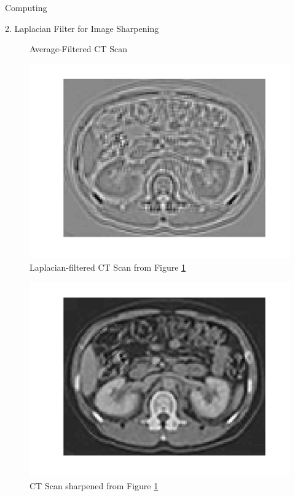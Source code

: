 \begin{section}{Computing}
\begin{homeworkSection}{2. Laplacian Filter for Image Sharpening}
{\begin{minipage}{0.5\textwidth}
\begin{figure}[H]
        \caption{Average-Filtered CT Scan}
        \label{fig:CTavg}
        \end{figure}
    \end{minipage}
    \begin{minipage}{0.5\textwidth}
        \begin{figure}[H]
        \centering
        \includegraphics[trim={0cm 1.5cm 1cm 0.5cm},clip,width=0.8\columnwidth]{../data/CTlap}
        \caption{Laplacian-filtered CT Scan from Figure \ref{fig:CTavg}}
        \label{fig:CTlap}
        \end{figure}
    \end{minipage}
    \begin{minipage}{0.5\textwidth}
        \begin{figure}[H]
        \centering
        \includegraphics[trim={0cm 1.5cm 1cm 0.5cm},clip,width=0.8\columnwidth]{../data/CTsharp}
        \caption{CT Scan sharpened from Figure \ref{fig:CTavg}}
        \label{fig:CTsharp}
        \end{figure}
    \end{minipage}
}
\end{homeworkSection}
\end{section}
